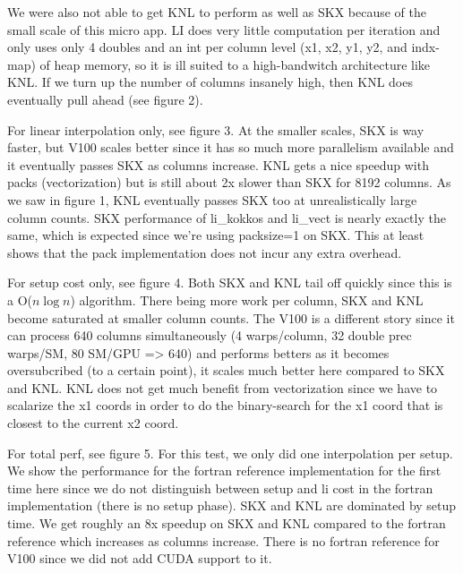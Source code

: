 \documentclass[10pt,twocolumn]{article}
\begin{document}
We were also not able to get KNL to perform as well as SKX because of the small scale
of this micro app. LI does very little computation per iteration and only uses only 4 doubles and an
int per column level (x1, x2, y1, y2, and indx-map) of heap memory, so it is ill suited to a high-bandwitch architecture
like KNL. If we turn up the number of columns insanely high, then KNL does eventually
pull ahead (see figure 2).

For linear interpolation only, see figure 3. At the smaller scales,
SKX is way faster, but V100 scales better since it has so much more
parallelism available and it eventually passes SKX as columns increase. KNL gets a nice speedup with packs
(vectorization) but is still about 2x slower than SKX for 8192
columns. As we saw in figure 1, KNL eventually passes SKX too at unrealistically large
column counts. SKX performance of li\_kokkos and li\_vect is nearly exactly the
same, which is expected since we're using packsize=1 on SKX. This at
least shows that the pack implementation does not incur any extra
overhead.

For setup cost only, see figure 4. Both SKX and KNL tail off quickly
since this is a O($n \log n$) algorithm. There being more work per column,
SKX and KNL become saturated at smaller column counts. The V100 is a different
story since it can process 640 columns simultaneously (4 warps/column, 32 double prec warps/SM, 80 SM/GPU => 640)
and performs betters as it becomes oversubcribed (to a certain point), it
scales much better here compared to SKX and KNL. KNL does not get much benefit from
vectorization since we have to scalarize the x1 coords in order to do
the binary-search for the x1 coord that is closest to the current x2
coord.

For total perf, see figure 5. For this test, we only did one
interpolation per setup. We show the performance for the fortran
reference implementation for the first time here since we do not
distinguish between setup and li cost in the fortran implementation
(there is no setup phase). SKX and KNL are dominated by setup time. We
get roughly an 8x speedup on SKX and KNL compared to the fortran
reference which increases as columns increase. There is no fortran
reference for V100 since we did not add CUDA support to it.

\onecolumn
\end{document}
